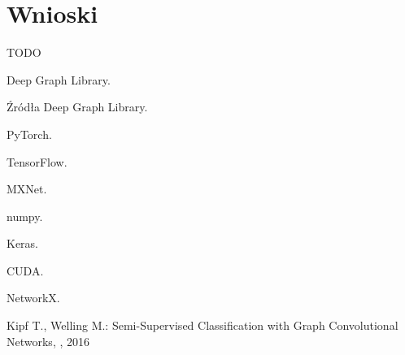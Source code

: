 \documentclass{article}
\begin{document}
\section{Wnioski}
\label{sec:conclusions}
TODO

  


\clearpage
\renewcommand\refname{Źródła}
\begin{thebibliography}{1}

\newblock Deep Graph Library. 

\newblock Źródła Deep Graph Library. 

\newblock PyTorch. 

\newblock TensorFlow. 

\newblock MXNet. 

\newblock numpy. 

\newblock Keras. 

\newblock CUDA. 

\newblock NetworkX. 


Kipf T., Welling M.:
\newblock Semi-Supervised Classification with Graph Convolutional Networks,
, 2016
\end{thebibliography}
\end{document}
